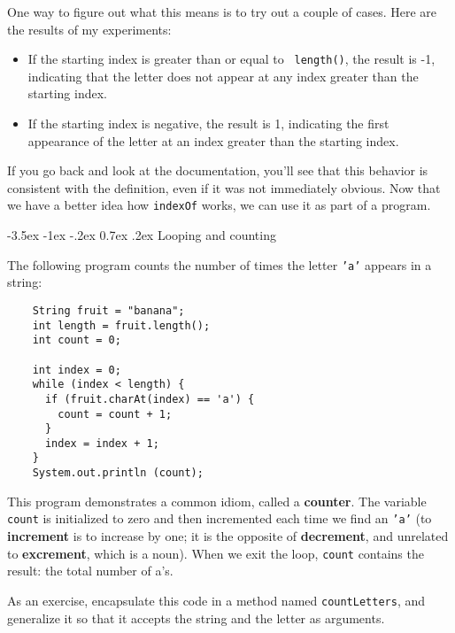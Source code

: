 \documentclass{book}
\makeatletter
\renewcommand{\section}{\@startsection 
    {section} {1} {0mm}%
    {-3.5ex \@plus -1ex \@minus -.2ex}%
    {0.7ex \@plus.2ex}%
    {\normalfont\Large\bfseries}}
\makeatother
\begin{document}
One way to figure out what this means is to try out a couple
of cases.  Here are the results of my experiments:

\begin{itemize}

\item If the starting index is greater than or equal to {\tt
length()}, the result is -1, indicating that the letter
does not appear at any index greater than the starting index.

\item If the starting index is negative, the result is 1,
indicating the first appearance of the letter at an index
greater than the starting index.

\end{itemize}

If you go back and look at the documentation, you'll see that
this behavior is consistent with the definition, even if it
was not immediately obvious.  Now that we have a better idea
how {\tt indexOf} works, we can use it as part of a program.

\section{Looping and counting}
\label{loopcount}

The following program counts the
number of times the letter {\tt 'a'} appears in a string:

\begin{verbatim}
    String fruit = "banana";
    int length = fruit.length();
    int count = 0;

    int index = 0;
    while (index < length) {
      if (fruit.charAt(index) == 'a') {
        count = count + 1;
      }
      index = index + 1;
    }
    System.out.println (count);
\end{verbatim}
%
This program demonstrates a common idiom, called a {\bf counter}.  The
variable {\tt count} is initialized to zero and then incremented each
time we find an {\tt 'a'} (to {\bf increment} is to increase by one;
it is the opposite of {\bf decrement}, and unrelated to {\bf
excrement}, which is a noun).  When we exit the loop, {\tt count}
contains the result: the total number of a's.


As an exercise, encapsulate this code in a method named
{\tt countLetters}, and generalize it so that it accepts the
string and the letter as arguments.
\end{document}
